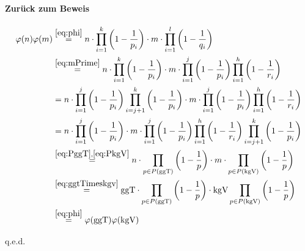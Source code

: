 \documentclass[DIN, pagenumber=false, fontsize=11pt, parskip=half]{scrartcl}
\newcommand{\ggt}{\text{ggT}}
\newcommand{\kgv}{\text{kgV}}
\begin{document}
\begin{enumerate}[label=\alph*)]
        \paragraph{Zurück zum Beweis}
        \begin{align*}
            \varphi(n) \varphi(m) &\stackrel{\ref{eq:phi}}{=} n \cdot \prod_{i=1}^k{\left(1 - \frac{1}{p_i}\right)} 
            \cdot m \cdot \prod_{i=1}^l{\left(1 - \frac{1}{q_i}\right)} \\
            &\stackrel{\ref{eq:mPrime}}{=} n \cdot \prod_{i=1}^k{\left(1 - \frac{1}{p_i}\right)} 
            \cdot m \cdot \prod_{i=1}^j{\left(1 - \frac{1}{p_i}\right)} \prod_{i=1}^h{\left(1 - \frac{1}{r_i}\right)} \\
            &= n \cdot \prod_{i=1}^{j}{\left(1 - \frac{1}{p_i}\right)} \prod_{i=j+1}^k{\left(1 - \frac{1}{p_i}\right)}
            \cdot m \cdot \prod_{i=1}^j{\left(1 - \frac{1}{p_i}\right)} \prod_{i=1}^h{\left(1 - \frac{1}{r_i}\right)} \\
            &= n \cdot \prod_{i=1}^{j}{\left(1 - \frac{1}{p_i}\right)} \cdot m \cdot \prod_{i=1}^j{\left(1 - \frac{1}{p_i}\right)} 
            \prod_{i=1}^h{\left(1 - \frac{1}{r_i}\right)} \prod_{i=j+1}^k{\left(1 - \frac{1}{p_i}\right)}\\
            &\stackrel{\ref{eq:PggT}, \ref{eq:PkgV}}{=} n \cdot \prod_{p \in P(\ggt)}{\left(1 - \frac{1}{p}\right)}
            \cdot m \cdot \prod_{p \in P(\kgv)}{\left(1 - \frac{1}{p}\right)} \\
            &\stackrel{\ref{eq:ggtTimeskgv}}{=} \ggt \cdot \prod_{p \in P(\ggt)}{\left(1 - \frac{1}{p}\right)} 
            \cdot \kgv \prod_{p \in P(\kgv)}{\left(1 - \frac{1}{p}\right)} \\
            &\stackrel{\ref{eq:phi}}{=} \varphi(\ggt) \varphi(\kgv) \\
        \end{align*}
        \begin{flushright}
            q.e.d.
        \end{flushright}
    \end{enumerate}
\end{document}
